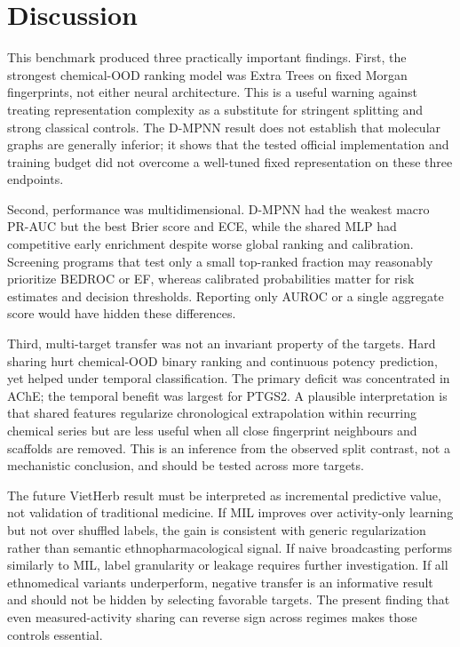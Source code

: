 \documentclass[11pt]{article}
\begin{document}
\section{Discussion}

This benchmark produced three practically important findings. First, the
strongest chemical-OOD ranking model was Extra Trees on fixed Morgan
fingerprints, not either neural architecture. This is a useful warning against
treating representation complexity as a substitute for stringent splitting and
strong classical controls. The D-MPNN result does not establish that molecular
graphs are generally inferior; it shows that the tested official implementation
and training budget did not overcome a well-tuned fixed representation on these
three endpoints.

Second, performance was multidimensional. D-MPNN had the weakest macro PR-AUC
but the best Brier score and ECE, while the shared MLP had competitive early
enrichment despite worse global ranking and calibration. Screening programs
that test only a small top-ranked fraction may reasonably prioritize BEDROC or
EF, whereas calibrated probabilities matter for risk estimates and decision
thresholds. Reporting only AUROC or a single aggregate score would have hidden
these differences.

Third, multi-target transfer was not an invariant property of the targets.
Hard sharing hurt chemical-OOD binary ranking and continuous potency prediction,
yet helped under temporal classification. The primary deficit was concentrated
in AChE; the temporal benefit was largest for PTGS2. A plausible interpretation
is that shared features regularize chronological extrapolation within recurring
chemical series but are less useful when all close fingerprint neighbours and
scaffolds are removed. This is an inference from the observed split contrast,
not a mechanistic conclusion, and should be tested across more targets.

The future VietHerb result must be interpreted as incremental predictive value,
not validation of traditional medicine. If MIL improves over activity-only
learning but not over shuffled labels, the gain is consistent with generic
regularization rather than semantic ethnopharmacological signal. If naive
broadcasting performs similarly to MIL, label granularity or leakage requires
further investigation. If all ethnomedical variants underperform, negative
transfer is an informative result and should not be hidden by selecting
favorable targets. The present finding that even measured-activity sharing can
reverse sign across regimes makes those controls essential.
\end{document}
